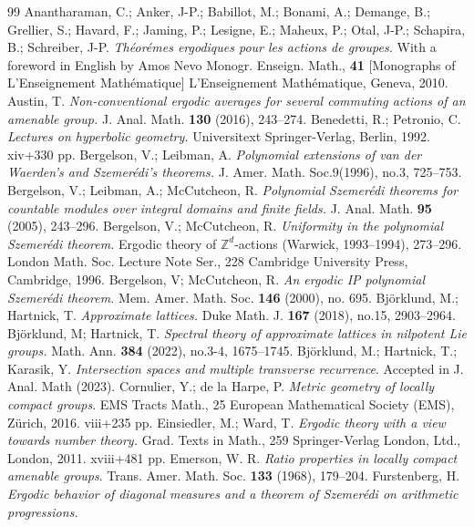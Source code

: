 \documentclass[12pt,reqno,a4paper]{amsart}
\numberwithin{equation}{section}
\newcommand{\bZ}{\mathbb{Z}}
\theoremstyle{theorem}
\theoremstyle{task}
\theoremstyle{definition}
\begin{document}
\begin{thebibliography}{99}
Anantharaman, C.; Anker, J-P.; Babillot, M.; Bonami, A.; Demange, B.; Grellier, S.; Havard, F.; Jaming, P.; Lesigne, E.; Maheux, P.; Otal, J-P.; Schapira, B.; Schreiber, J-P.
\emph{Th\'eor\'emes ergodiques pour les actions de groupes.} 
With a foreword in English by Amos Nevo
Monogr. Enseign. Math., \textbf{41} [Monographs of L'Enseignement Math\'ematique]
L'Enseignement Math\'ematique, Geneva, 2010. 
Austin, T.
\emph{Non-conventional ergodic averages for several commuting actions of an amenable group.} 
J. Anal. Math. \textbf{130} (2016), 243--274.
Benedetti, R.; Petronio, C.
\emph{Lectures on hyperbolic geometry.} 
Universitext Springer-Verlag, Berlin, 1992. xiv+330 pp.
Bergelson, V.; Leibman, A.
\emph{Polynomial extensions of van der Waerden's and Szemer\'edi's theorems.}
J. Amer. Math. Soc.9(1996), no.3, 725--753.
Bergelson, V.; Leibman, A.; McCutcheon, R.
\emph{Polynomial Szemer\'edi theorems for countable modules over integral domains and finite fields.}
J. Anal. Math. \textbf{95} (2005), 243--296.
Bergelson, V.; McCutcheon, R.
\emph{Uniformity in the polynomial Szemer\'edi theorem.}
Ergodic theory of $\bZ^d$-actions (Warwick, 1993--1994), 273--296.
London Math. Soc. Lecture Note Ser., 228
Cambridge University Press, Cambridge, 1996.
Bergelson, V; McCutcheon, R.
\emph{An ergodic IP polynomial Szemer\'edi theorem.}
Mem. Amer. Math. Soc. \textbf{146} (2000), no. 695.
Bj\"orklund, M.; Hartnick, T.
\emph{Approximate lattices.} 
Duke Math. J. \textbf{167} (2018), no.15, 2903--2964.
Bj\"orklund, M; Hartnick, T.
\emph{Spectral theory of approximate lattices in nilpotent Lie groups.} 
Math. Ann. \textbf{384} (2022), no.3-4, 1675--1745.
Bj\"orklund, M.; Hartnick, T.; Karasik, Y.
\emph{Intersection spaces and multiple transverse recurrence}.
Accepted in J. Anal. Math (2023). 
Cornulier, Y.; de la Harpe, P.
\emph{Metric geometry of locally compact groups}.
EMS Tracts Math., 25
European Mathematical Society (EMS), Z\"urich, 2016. viii+235 pp.
Einsiedler, M.; Ward, T.
\emph{Ergodic theory with a view towards number theory.}
Grad. Texts in Math., 259
Springer-Verlag London, Ltd., London, 2011. xviii+481 pp.
Emerson, W. R.
\emph{Ratio properties in locally compact amenable groups}.
Trans. Amer. Math. Soc. \textbf{133} (1968), 179--204.
Furstenberg, H.
\emph{Ergodic behavior of diagonal measures and a theorem of Szemer\'edi on arithmetic progressions.}

\end{thebibliography}
\end{document}
